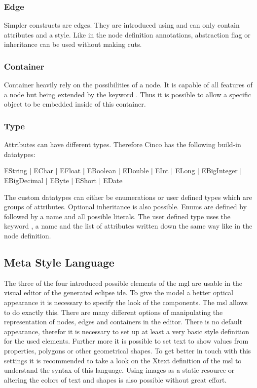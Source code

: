 \subsubsection{Edge}

Simpler constructs are edges. They are introduced using  and can only contain attributes and a style. Like in the node definition annotations, abstraction flag or inheritance can be used without making cuts.

\subsubsection{Container}

Container heavily rely on the possibilities of a node. It is capable of all features of a node but being extended by the keyword . Thus it is possible to allow a specific object to be embedded inside of this container.

\subsubsection{Type}

Attributes can have different types. Therefore Cinco has the following build-in datatypes:

\begin{center}
	EString | EChar | EFloat | EBoolean | EDouble | EInt | ELong | EBigInteger | EBigDecimal | EByte | EShort | EDate
\end{center}


The custom datatypes can either be enumerations or user defined types which are groups of attributes. Optional inheritance is also possible. Enums are defined by  followed by a name and all possible literals. The user defined type uses the keyword , a name and the list of attributes written down the same way like in the node definition.

\subsection{Meta Style Language}

The three of the four introduced possible elements of the \gls{mgl} are usable in the visual editor of the generated eclipse \gls{ide}. To give the model a better optical appearance it is necessary to specify the look of the components. The \gls{msl} allows to do exactly this. There are many different options of manipulating the representation of nodes, edges and containers in the editor. There is no default appearance, therefor it is necessary to set up at least a very basic style definition for the used elements. Further more it is possible to set text to show values from properties, polygons or other geometrical shapes. To get better in touch with this settings it is recommended to take a look on the Xtext definition of the \gls{msl} to understand the syntax of this language. Using images as a static resource or altering the colors of text and shapes is also possible without great effort.